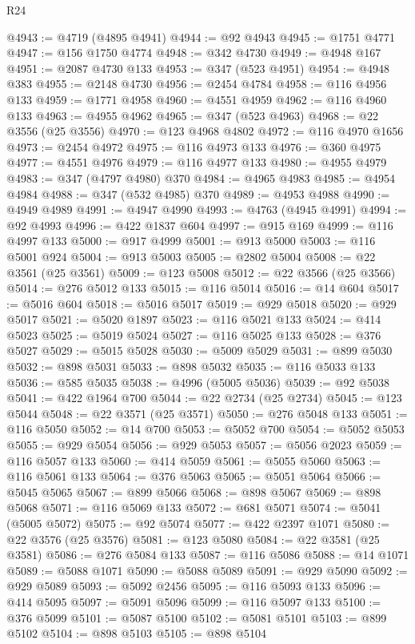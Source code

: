 \begin{lexlean}{R24}
\begin{coremodule}
@4943 := @4719 (@4895 @4941)
@4944 := @92 @4943
@4945 := @1751 @4771
@4947 := @156 @1750 @4774
@4948 := @342 @4730
@4949 := @4948 @167
@4951 := @2087 @4730 @133
@4953 := @347 (@523 @4951)
@4954 := @4948 @383
@4955 := @2148 @4730
@4956 := @2454 @4784
@4958 := @116 @4956 @133
@4959 := @1771 @4958
@4960 := @4551 @4959
@4962 := @116 @4960 @133
@4963 := @4955 @4962
@4965 := @347 (@523 @4963)
@4968 := @22 @3556 (@25 @3556)
@4970 := @123 @4968 @4802
@4972 := @116 @4970 @1656
@4973 := @2454 @4972
@4975 := @116 @4973 @133
@4976 := @360 @4975
@4977 := @4551 @4976
@4979 := @116 @4977 @133
@4980 := @4955 @4979
@4983 := @347 (@4797 @4980) @370
@4984 := @4965 @4983
@4985 := @4954 @4984
@4988 := @347 (@532 @4985) @370
@4989 := @4953 @4988
@4990 := @4949 @4989
@4991 := @4947 @4990
@4993 := @4763 (@4945 @4991)
@4994 := @92 @4993
@4996 := @422 @1837 @604
@4997 := @915 @169
@4999 := @116 @4997 @133
@5000 := @917 @4999
@5001 := @913 @5000
@5003 := @116 @5001 @924
@5004 := @913 @5003
@5005 := @2802 @5004
@5008 := @22 @3561 (@25 @3561)
@5009 := @123 @5008
@5012 := @22 @3566 (@25 @3566)
@5014 := @276 @5012 @133
@5015 := @116 @5014
@5016 := @14 @604
@5017 := @5016 @604
@5018 := @5016 @5017
@5019 := @929 @5018
@5020 := @929 @5017
@5021 := @5020 @1897
@5023 := @116 @5021 @133
@5024 := @414 @5023
@5025 := @5019 @5024
@5027 := @116 @5025 @133
@5028 := @376 @5027
@5029 := @5015 @5028
@5030 := @5009 @5029
@5031 := @899 @5030
@5032 := @898 @5031
@5033 := @898 @5032
@5035 := @116 @5033 @133
@5036 := @585 @5035
@5038 := @4996 (@5005 @5036)
@5039 := @92 @5038
@5041 := @422 @1964 @700
@5044 := @22 @2734 (@25 @2734)
@5045 := @123 @5044
@5048 := @22 @3571 (@25 @3571)
@5050 := @276 @5048 @133
@5051 := @116 @5050
@5052 := @14 @700
@5053 := @5052 @700
@5054 := @5052 @5053
@5055 := @929 @5054
@5056 := @929 @5053
@5057 := @5056 @2023
@5059 := @116 @5057 @133
@5060 := @414 @5059
@5061 := @5055 @5060
@5063 := @116 @5061 @133
@5064 := @376 @5063
@5065 := @5051 @5064
@5066 := @5045 @5065
@5067 := @899 @5066
@5068 := @898 @5067
@5069 := @898 @5068
@5071 := @116 @5069 @133
@5072 := @681 @5071
@5074 := @5041 (@5005 @5072)
@5075 := @92 @5074
@5077 := @422 @2397 @1071
@5080 := @22 @3576 (@25 @3576)
@5081 := @123 @5080
@5084 := @22 @3581 (@25 @3581)
@5086 := @276 @5084 @133
@5087 := @116 @5086
@5088 := @14 @1071
@5089 := @5088 @1071
@5090 := @5088 @5089
@5091 := @929 @5090
@5092 := @929 @5089
@5093 := @5092 @2456
@5095 := @116 @5093 @133
@5096 := @414 @5095
@5097 := @5091 @5096
@5099 := @116 @5097 @133
@5100 := @376 @5099
@5101 := @5087 @5100
@5102 := @5081 @5101
@5103 := @899 @5102
@5104 := @898 @5103
@5105 := @898 @5104

\end{coremodule}
\end{lexlean}

